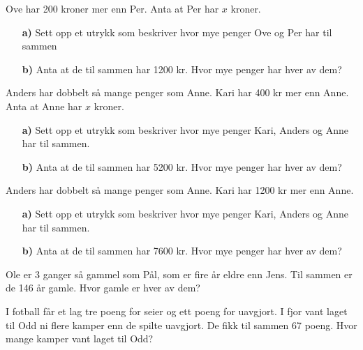 \documentclass[a4, 11pt, twoside]{article}
\theoremstyle{definition}
\begin{document}
\begin{Exercise}
Ove har 200 kroner mer enn
 Per. Anta at Per har $x$ kroner.
\begin{itemize}
 \item[\bf a)] Sett opp et utrykk som beskriver hvor mye penger Ove og Per har til sammen
 \item[\bf b)] Anta at de til sammen har 1200 kr. Hvor mye penger har hver av dem?
\end{itemize}
\end{Exercise}

\begin{Exercise}
Anders har dobbelt så mange penger som
 Anne. Kari har 400 kr mer enn Anne. Anta at Anne har $x$ kroner.
\begin{itemize}
 \item[\bf a)] Sett opp et utrykk som beskriver hvor mye penger Kari, Anders og Anne har til 
 sammen.
 \item[\bf b)] Anta at de til sammen har 5200 kr. Hvor mye penger har hver av dem?
\end{itemize}
\end{Exercise}

\begin{Exercise}
Anders har dobbelt så mange penger som Anne. 
Kari har 1200 kr mer enn Anne.
\begin{itemize}
 \item[\bf a)] Sett opp et utrykk som beskriver hvor mye penger Kari, Anders og Anne har til 
 sammen.
 \item[\bf b)] Anta at de til sammen har 7600 kr. Hvor mye penger har hver av dem?
\end{itemize}
\end{Exercise}

\begin{Exercise}
  Ole er 3 ganger så gammel som Pål, som er fire år eldre enn Jens.
  Til sammen er de 146 år gamle. Hvor gamle er hver av dem?
\end{Exercise}

\begin{Exercise}
I fotball får et lag tre poeng for seier og ett poeng for uavgjort.
I fjor vant laget til Odd ni flere kamper enn de spilte uavgjort. De
fikk til sammen 67 poeng. \newline
Hvor mange kamper vant laget til Odd?
\end{Exercise}
\end{document}
